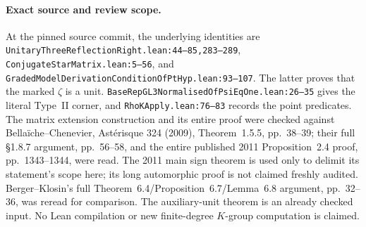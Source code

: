 \paragraph{Exact source and review scope.}
At the pinned source commit, the underlying identities are
\texttt{UnitaryThreeReflectionRight.lean:44--85,283--289},
\texttt{ConjugateStarMatrix.lean:5--56}, and
\texttt{GradedModelDerivationConditionOfPtHyp.lean:93--107}.
The latter proves that the marked $\zeta$ is a unit.
\texttt{BaseRepGL3NormalisedOfPsiEqOne.lean:26--35} gives
the literal Type~II corner, and
\texttt{RhoKApply.lean:76--83} records the point predicates.
The matrix extension construction and its entire proof were
checked against Bella\"iche--Chenevier, Ast\'erisque 324
(2009), Theorem~1.5.5, pp.~38--39; their full
\S1.8.7 argument, pp.~56--58, and the entire published
2011 Proposition~2.4 proof, pp.~1343--1344, were read.
The 2011 main sign theorem is used only to delimit its
statement's scope here; its long automorphic proof is not
claimed freshly audited.  Berger--Klosin's full
Theorem~6.4/Proposition~6.7/Lemma~6.8 argument, pp.~32--36,
was reread for comparison.  The auxiliary-unit theorem
is an already checked input.  No Lean compilation or
new finite-degree $K$-group computation is claimed.
